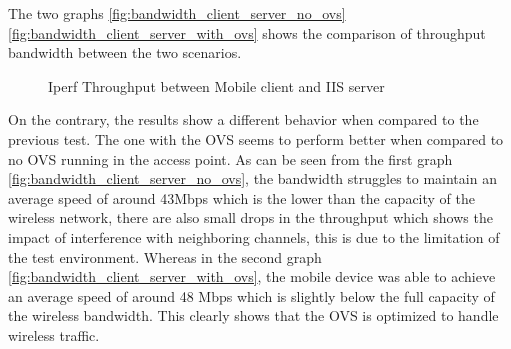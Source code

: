 The two graphs \ref{fig:bandwidth_client_server_no_ovs} \ref{fig:bandwidth_client_server_with_ovs} shows the comparison of throughput bandwidth between the two scenarios.
\begin{figure}
	\centering
	\hfill
	\caption{Iperf Throughput between Mobile client and IIS server}
\end{figure}

On the contrary, the results show a different behavior when compared to the previous test. The one with the OVS seems to perform better when compared to no OVS running in the access point. As can be seen from the first graph \ref{fig:bandwidth_client_server_no_ovs}, the bandwidth struggles to maintain an average speed of around 43Mbps which is the lower than the capacity of the wireless network, there are also small drops in the throughput which shows the impact of interference with neighboring channels, this is due to the limitation of the test environment. Whereas in the second graph \ref{fig:bandwidth_client_server_with_ovs}, the mobile device was able to achieve an average speed of around 48 Mbps which is slightly below the full capacity of the wireless bandwidth. This clearly shows that the OVS is optimized to handle wireless traffic.

